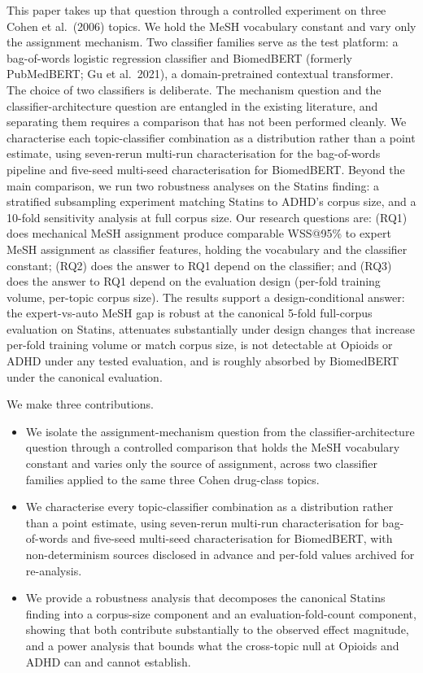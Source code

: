 \documentclass[11pt,a4paper]{article}
\begin{document}
This paper takes up that question through a controlled experiment on three Cohen et al.\ (2006) topics. We hold the MeSH vocabulary constant and vary only the assignment mechanism. Two classifier families serve as the test platform: a bag-of-words logistic regression classifier and BiomedBERT (formerly PubMedBERT; Gu et al.\ 2021), a domain-pretrained contextual transformer. The choice of two classifiers is deliberate. The mechanism question and the classifier-architecture question are entangled in the existing literature, and separating them requires a comparison that has not been performed cleanly. We characterise each topic-classifier combination as a distribution rather than a point estimate, using seven-rerun multi-run characterisation for the bag-of-words pipeline and five-seed multi-seed characterisation for BiomedBERT. Beyond the main comparison, we run two robustness analyses on the Statins finding: a stratified subsampling experiment matching Statins to ADHD's corpus size, and a 10-fold sensitivity analysis at full corpus size. Our research questions are: (RQ1) does mechanical MeSH assignment produce comparable WSS@95\% to expert MeSH assignment as classifier features, holding the vocabulary and the classifier constant; (RQ2) does the answer to RQ1 depend on the classifier; and (RQ3) does the answer to RQ1 depend on the evaluation design (per-fold training volume, per-topic corpus size). The results support a design-conditional answer: the expert-vs-auto MeSH gap is robust at the canonical 5-fold full-corpus evaluation on Statins, attenuates substantially under design changes that increase per-fold training volume or match corpus size, is not detectable at Opioids or ADHD under any tested evaluation, and is roughly absorbed by BiomedBERT under the canonical evaluation.

We make three contributions.

\begin{itemize}
\setlength{\itemsep}{2pt}
\item We isolate the assignment-mechanism question from the classifier-architecture question through a controlled comparison that holds the MeSH vocabulary constant and varies only the source of assignment, across two classifier families applied to the same three Cohen drug-class topics.
\item We characterise every topic-classifier combination as a distribution rather than a point estimate, using seven-rerun multi-run characterisation for bag-of-words and five-seed multi-seed characterisation for BiomedBERT, with non-determinism sources disclosed in advance and per-fold values archived for re-analysis.
\item We provide a robustness analysis that decomposes the canonical Statins finding into a corpus-size component and an evaluation-fold-count component, showing that both contribute substantially to the observed effect magnitude, and a power analysis that bounds what the cross-topic null at Opioids and ADHD can and cannot establish.
\end{itemize}
\end{document}
